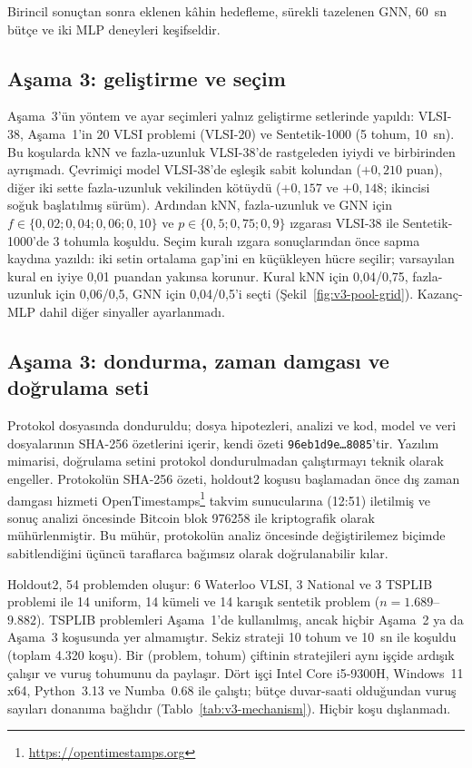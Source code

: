\documentclass[pdflatex,sn-basic]{sn-jnl}
\begin{document}
Birincil sonuçtan sonra eklenen kâhin hedefleme, sürekli tazelenen GNN, 60~sn bütçe ve iki MLP
deneyleri keşifseldir.

\subsection{Aşama 3: geliştirme ve seçim}\label{sec:deney-asama3}

Aşama~3'ün yöntem ve ayar seçimleri yalnız geliştirme setlerinde yapıldı: VLSI-38, Aşama~1'in 20
VLSI problemi (VLSI-20) ve Sentetik-1000 (5 tohum, 10~sn). Bu koşularda kNN ve fazla-uzunluk
VLSI-38'de rastgeleden iyiydi ve birbirinden ayrışmadı.
Çevrimiçi model VLSI-38'de eşleşik sabit kolundan ($+0{,}210$ puan), diğer iki sette fazla-uzunluk
vekilinden kötüydü ($+0{,}157$ ve $+0{,}148$; ikincisi soğuk başlatılmış sürüm).
Ardından kNN, fazla-uzunluk ve GNN için $f\in\{0{,}02;0{,}04;0{,}06;0{,}10\}$ ve
$p\in\{0{,}5;0{,}75;0{,}9\}$ ızgarası VLSI-38 ile Sentetik-1000'de 3 tohumla koşuldu. Seçim kuralı
ızgara sonuçlarından önce sapma kaydına yazıldı: iki setin ortalama gap'ini en küçükleyen hücre
seçilir; varsayılan kural en iyiye 0,01 puandan yakınsa korunur. Kural kNN için 0,04/0,75,
fazla-uzunluk için 0,06/0,5, GNN için 0,04/0,5'i seçti (Şekil~\ref{fig:v3-pool-grid}).
Kazanç-MLP dahil diğer sinyaller ayarlanmadı.

\subsection{Aşama 3: dondurma, zaman damgası ve doğrulama seti}\label{sec:deney-dondurma}

Protokol  dosyasında donduruldu; dosya hipotezleri, analizi ve kod, model ve
veri dosyalarının SHA-256 özetlerini içerir, kendi özeti \texttt{96eb1d9e\ldots8085}'tir.
Yazılım mimarisi, doğrulama setini protokol dondurulmadan çalıştırmayı teknik olarak engeller.
Protokolün SHA-256 özeti, holdout2 koşusu başlamadan önce dış zaman damgası hizmeti
OpenTimestamps\footnote{\url{https://opentimestamps.org}} takvim sunucularına (12:51) iletilmiş
ve sonuç analizi öncesinde Bitcoin blok 976258 ile kriptografik olarak mühürlenmiştir.
Bu mühür, protokolün analiz öncesinde değiştirilemez biçimde sabitlendiğini üçüncü taraflarca
bağımsız olarak doğrulanabilir kılar.

Holdout2, 54 problemden oluşur: 6 Waterloo VLSI, 3 National ve 3 TSPLIB problemi ile 14 uniform,
14 kümeli ve 14 karışık sentetik problem ($n=1.689$--$9.882$).
TSPLIB problemleri Aşama~1'de kullanılmış, ancak hiçbir Aşama~2 ya da Aşama~3 koşusunda yer
almamıştır. Sekiz strateji 10 tohum ve 10~sn ile koşuldu (toplam 4.320 koşu).
Bir (problem, tohum) çiftinin stratejileri aynı işçide ardışık çalışır ve vuruş tohumunu da
paylaşır. Dört işçi Intel Core i5-9300H, Windows~11 x64, Python~3.13 ve Numba~0.68
ile çalıştı; bütçe duvar-saati olduğundan vuruş sayıları donanıma bağlıdır
(Tablo~\ref{tab:v3-mechanism}). Hiçbir koşu dışlanmadı.
\end{document}
